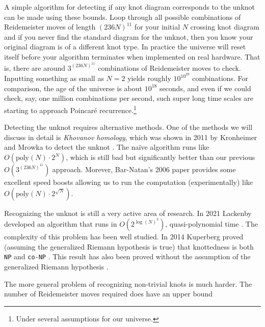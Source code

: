     A simple algorithm for detecting if any knot diagram corresponds to the
    unknot can be made using these bounds. Loop through all possible
    combinations of Reidemeister moves of length $(236N)^{11}$ for your
    initial $N$ crossing knot diagram and if you never
    find the standard diagram for the unknot,
    then you know your original diagram
    is of a different knot type. In practice the universe will reset itself
    before your algorithm terminates when implemented on real hardware. That is,
    there are around $3^{(236N)^{11}}$ combinations of Reidemeister moves to
    check. Inputting something as small as $N=2$ yields roughly
    $10^{10^{29}}$ combinations. For comparison, the age of the universe is
    about $10^{18}$ seconds, and even if we could check, say, one million
    combinations per second, such super long time scales are starting to
    approach Poincar\'{e} recurrence.\footnote{%
        Under several assumptions for our universe.
    }
    \par\hfill\par
    Detecting the unknot requires alternative methods. One of the methods we
    will discuss in detail is \textit{Khovanov homology}, which was shown in
    2011 by Kronheimer and Mrowka to detect the unknot
    \cite{KronheimerMrowka2011KhovanovUnknot}. The na\"{i}ve algorithm runs
    like $O(\textrm{poly}(N)\cdot{2}^{N})$, which is still bad but
    significantly better than our previous $O(3^{(236N)^{11}})$ approach.
    Morever, Bar-Natan's 2006 paper provides some excellent speed boosts
    \cite{BarNatan2006FASTKH} allowing us to run the computation
    (experimentally) like $O(\textrm{poly}(N)\cdot{2}^{\sqrt{N}})$.
    \par\hfill\par
    Recognizing the unknot is still a very active area of research. In 2021
    Lackenby developed an algorithm that runs in
    $O(2^{\log(N)^{3}})$, quasi-polynomial time
    \cite{LackenBy2021QuasiPolyUnknotting}. The complexity of this problem
    has been well studied. In 2014 Kuperberg proved (assuming the generalized
    Riemann hypothesis is true) that knottedness is both \texttt{NP} and
    \texttt{co-NP} \cite{Kuperberg2014KnottednessNP}. This result has also been
    proved without the assumption of the generalized Riemann hypothesis
    \cite{Lackenby2021UnknotNP}.
    \par\hfill\par
    The more general problem of recognizing non-trivial knots is much harder.
    The number of Reidemeister moves required does have an upper bound
